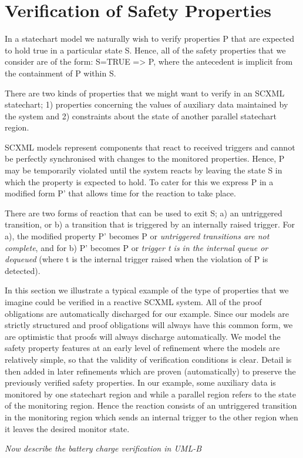 

\section{Verification of Safety Properties}

In a statechart model we naturally wish to verify properties P that are expected to hold true in a particular state S.
Hence, all of the safety properties that we consider are of the form: S=TRUE => P, where the antecedent is implicit from the containment of P within S.

There are two kinds of properties that we might want to verify in an SCXML statechart;
1) properties concerning the values of auxiliary data maintained by the system and 2) constraints about the state of another parallel statechart region.

SCXML models represent components that react to received triggers and cannot be perfectly synchronised with changes to the monitored properties. 
Hence, P may be temporarily violated until the system reacts by leaving the state S in which the property is expected to hold.
To cater for this we express P in a modified form P' that allows time for the reaction to take place.

There are two forms of reaction that can be used to exit S; a) an untriggered transition, or b) a transition that is triggered by an internally raised trigger.
For a), the modified property P' becomes P or \emph{untriggered transitions are not complete}, and for b) P' becomes P or \emph{trigger t is in the internal queue or dequeued} (where t is the internal trigger raised when the violation of P is detected).


In this section we illustrate a typical example of the type of properties that we imagine could be verified in a reactive SCXML system.
All of the proof obligations are automatically discharged for our example.
Since our models are strictly structured and proof obligations will always have this common form, we are optimistic that proofs will always discharge automatically.
We model the safety property features at an early level of refinement where the models are relatively simple, so that the validity of verification conditions is clear. 
Detail is then added in later refinements which are proven (automatically) to preserve the previously verified safety properties.
In our example, some auxiliary data is monitored by one statechart region and while a parallel region refers to the state of the monitoring region. 
Hence the reaction consists of an untriggered transition in the monitoring region which sends an internal trigger to the other region when it leaves the desired monitor state.

\emph{Now describe the battery charge verification in UML-B}







